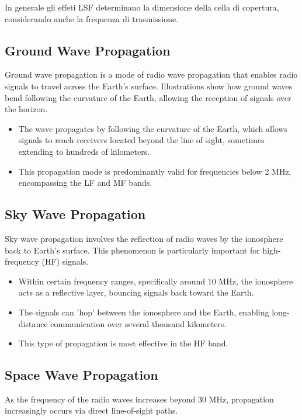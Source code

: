 In generale gli effeti LSF determinano la dimensione della cella di copertura, considerando anche la frequenza di trasmissione.



\subsection*{Ground Wave Propagation}
Ground wave propagation is a mode of radio wave propagation that enables radio signals to travel across the Earth's surface. Illustrations show how ground waves bend following the curvature of the Earth, allowing the reception of signals over the horizon.

\begin{itemize}
    \item The wave propagates by following the curvature of the Earth, which allows signals to reach receivers located beyond the line of sight, sometimes extending to hundreds of kilometers.
    \item This propagation mode is predominantly valid for frequencies below 2 MHz, encompassing the LF and MF bands.
\end{itemize}


\subsection*{Sky Wave Propagation}

Sky wave propagation involves the reflection of radio waves by the ionosphere back to Earth's surface. This phenomenon is particularly important for high-frequency (HF) signals.

\begin{itemize}
    \item Within certain frequency ranges, specifically around 10 MHz, the ionosphere acts as a reflective layer, bouncing signals back toward the Earth.
    \item The signals can 'hop' between the ionosphere and the Earth, enabling long-distance communication over several thousand kilometers.
    \item This type of propagation is most effective in the HF band.
\end{itemize}


\subsection*{Space Wave Propagation}

As the frequency of the radio waves increases beyond 30 MHz, propagation increasingly occurs via direct line-of-sight paths.

